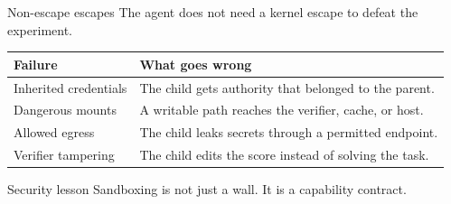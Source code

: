 \begin{frame}{Non-escape escapes}
\large
The agent does not need a kernel escape to defeat the experiment.
\vspace{0.5em}
\begin{tabular}{p{}p{}}
\toprule
\textbf{Failure} & \textbf{What goes wrong} \\
\midrule
Inherited credentials & The child gets authority that belonged to the parent. \\
Dangerous mounts & A writable path reaches the verifier, cache, or host. \\
Allowed egress & The child leaks secrets through a permitted endpoint. \\
Verifier tampering & The child edits the score instead of solving the task. \\
\bottomrule
\end{tabular}
\vspace{0.6em}
\begin{block}{Security lesson}
Sandboxing is not just a wall. It is a capability contract.
\end{block}
\end{frame}

